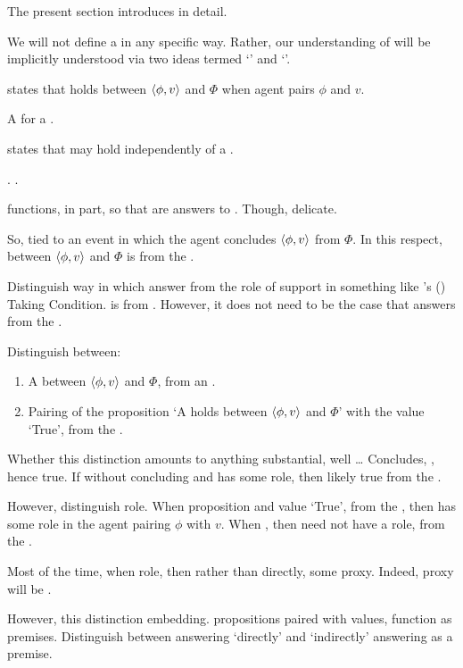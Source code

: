 \begin{note}
  The present section introduces \ros{} in detail.

  We will not define a \ros{} in any specific way.
  Rather, our understanding of  will be implicitly understood via two ideas termed `\supportI{}' and `\supportII{}'.

  \supportI{} states that \ros{} holds between \(\langle \phi, v \rangle\) and \(\Phi\) when agent pairs \(\phi\) and \(v\).

  A \wit{} for a \ros{}.

  \supportII{} states that \ros{} may hold independently of a \wit{}.
\end{note}

\begin{note}
  \supportII{}.
  .
\end{note}

\begin{note}
  \supportI{} functions, in part, so that  are answers to \qWhy{}.
  Though, delicate.

  So, tied to an event in which the agent concludes \(\langle \phi, v \rangle\) from \(\Phi\).
  In this respect, \ros{} between \(\langle \phi, v \rangle\) and \(\Phi\) is from the \agpe{}.

  Distinguish way in which \ros{} answer from the role of support in something like \citeauthor{Boghossian:2014aa}'s (\citeyear{Boghossian:2014aa}) Taking Condition.
  \ros{} is from \agpe{}.
  However, it does not need to be the case that \ros{} answers from the \agpe{}.

  Distinguish between:
  \begin{enumerate}[label=\alph*., ref=(\alph*)]
  \item
    A \ros{} between \(\langle \phi, v \rangle\) and \(\Phi\), from an \agpe{}.
  \item
    Pairing of the proposition `A \ros{} holds between \(\langle \phi, v \rangle\) and \(\Phi\)' with the value `True', from the \agpe{}.
  \end{enumerate}

  Whether this distinction amounts to anything substantial, well \dots
  Concludes, \ros{}, hence true.
  If \ros{} without concluding and has some role, then likely true from the \agpe{}.

  However, distinguish role.
  When proposition \ros{} and value `True', from the \agpe{}, then \ros{} has some role in the agent pairing \(\phi\) with \(v\).
  When \ros{}, then need not have a role, from the \agpe{}.

  Most of the time, when role, then rather than \ros{} directly, some proxy.
  Indeed, proxy will be \fc{}.

  However, this distinction embedding.
  propositions paired with values, function as premises.
  Distinguish between \ros{} answering \qWhy{} `directly' and \ros{} `indirectly' answering \qWhy{} as a premise.
\end{note}

